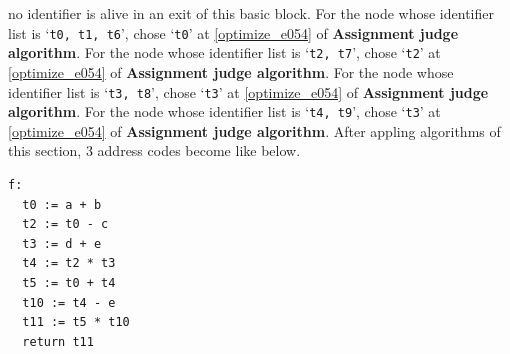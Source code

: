 \begin{Example}
no identifier is alive in an exit of this basic block.
For the node whose identifier list is `{\tt{t0, t1, t6}}',
chose `{\tt{t0}}' at \ref{optimize_e054}
of {\bf Assignment judge algorithm}.
For the node whose identifier list is `{\tt{t2, t7}}',
chose `{\tt{t2}}' at \ref{optimize_e054}
of {\bf Assignment judge algorithm}.
For the node whose identifier list is `{\tt{t3, t8}}',
chose `{\tt{t3}}' at \ref{optimize_e054}
of {\bf Assignment judge algorithm}.
For the node whose identifier list is `{\tt{t4, t9}}',
chose `{\tt{t3}}' at \ref{optimize_e054}
of {\bf Assignment judge algorithm}.
After appling algorithms of this section,
3 address codes become like below.
\begin{verbatim}
f:
  t0 := a + b
  t2 := t0 - c
  t3 := d + e
  t4 := t2 * t3
  t5 := t0 + t4
  t10 := t4 - e
  t11 := t5 * t10
  return t11
\end{verbatim}
\end{Example}


